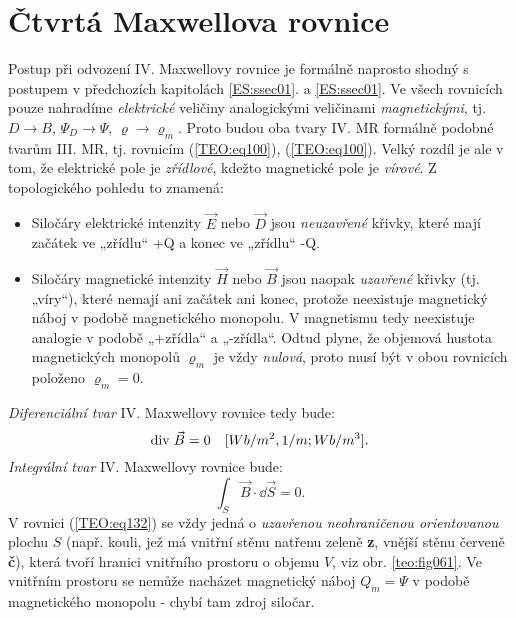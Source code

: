   \section{Čtvrtá Maxwellova rovnice}\label{ES:sec09}
    Postup při odvození IV. Maxwellovy rovnice je formálně naprosto shodný s postupem v předchozích
    kapitolách \ref{ES:ssec01}. a \ref{ES:ssec01}. Ve všech rovnicích pouze nahradíme
    \emph{elektrické} veličiny analogickými veličinami \emph{magnetickými}, tj. \(D\rightarrow B\),
    \(\Psi_D\rightarrow \Psi\), \(\varrho\rightarrow \varrho_m\). Proto budou oba tvary IV. MR
    formálně podobné tvarům III. MR, tj. rovnicím (\ref{TEO:eq100}), (\ref{TEO:eq100}). Velký rozdíl
    je ale v tom, že elektrické pole je \emph{zřídlové}, kdežto magnetické pole je \emph{vírové}. Z
    topologického pohledu to znamená:
    \begin{itemize}[noitemsep]
      \item Siločáry elektrické intenzity \(\vec{E}\) nebo \(\vec{D}\) jsou \emph{neuzavřené} 
            křivky, které mají začátek ve „zřídlu“ +Q a konec ve „zřídlu“ -Q.
    
      \item Siločáry magnetické intenzity \(\vec{H}\) nebo \(\vec{B}\) jsou naopak \emph{uzavřené} 
            křivky (tj. „víry“), které  nemají ani začátek ani konec, protože neexistuje magnetický
            náboj v podobě magnetického monopolu. V magnetismu tedy neexistuje analogie v podobě
            „+zřídla“ a „-zřídla“. Odtud plyne, že objemová hustota magnetických monopolů
            \(\varrho_m\) je vždy \emph{nulová}, proto musí být v obou rovnicích položeno
            \(\varrho_m = 0\).
    \end{itemize}
    \emph{Diferenciální tvar} IV. Maxwellovy rovnice tedy bude:
    \begin{equation*}
      \mathrm{div}\;\vec{B} = 0 \quad [Wb/m^2,1/m; Wb/m^3].
    \end{equation*}
    \emph{Integrální tvar} IV. Maxwellovy rovnice bude:
    \begin{equation}\label{TEO:eq132}
      \int_S\vec{B}\cdot \dd{\vec{S}} = 0.
    \end{equation}    
    V rovnici (\ref{TEO:eq132}) se vždy jedná o \emph{uzavřenou neohraničenou orientovanou} plochu
    \(S\) (např. kouli, jež má vnitřní stěnu natřenu zeleně \textbf{z}, vnější stěnu červeně
    \textbf{č}), která tvoří hranici vnitřního prostoru o objemu \(V\), viz obr. \ref{teo:fig061}.
    Ve vnitřním prostoru se nemůže nacházet magnetický náboj \(Q_m = \Psi\) v podobě magnetického
    monopolu - chybí tam zdroj siločar.
   
